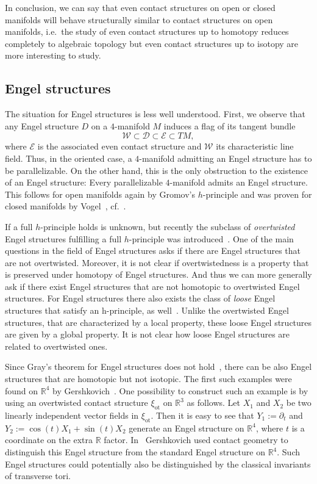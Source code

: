\documentclass{amsart} %
\newcommand{\R}{\mathbb{R}}
\newcommand{\xiot}{\xi_{\mathrm{ot}}}
\newcommand{\D}{\mathcal{D}}
\newcommand{\E}{\mathcal{E}}
\newcommand{\W}{\mathcal{W}}
\theoremstyle{thm}
\theoremstyle{definition}
\begin{document}
In conclusion, we can say that even contact structures on open or closed manifolds will behave structurally similar to contact structures on open manifolds, i.e.\ the study of even contact structures up to homotopy reduces completely to algebraic topology but even contact structures up to isotopy are more interesting to study. 


\subsection{Engel structures}
The situation for Engel structures is less well understood. First, we observe that any Engel structure $D$ on a $4$-manifold $M$ induces a flag of its tangent bundle
$$\W\subset\D\subset\E\subset TM,$$
where $\E$ is the associated even contact structure and $\W$ its characteristic line field. Thus, in the oriented case, a $4$-manifold admitting an Engel structure has to be parallelizable. On the other hand, this is the only obstruction to the existence of an Engel structure: Every parallelizable $4$-manifold admits an Engel structure. This follows for open manifolds again by Gromov's $h$-principle and was proven for closed manifolds by Vogel~\cite{Vo09}, cf.~\cite{CPPP17}.

If a full $h$-principle holds is unknown, but recently the subclass of \textit{overtwisted} Engel structures fulfilling a full $h$-principle was introduced~\cite{PV20}. One of the main questions in the field of Engel structures asks if there are Engel structures that are not overtwisted. Moreover, it is not clear if overtwistedness is a property that is preserved under homotopy of Engel structures. And thus we can more generally ask if there exist Engel structures that are not homotopic to overtwisted Engel structures. For Engel structures there also exists the class of \textit{loose} Engel structures that satisfy an h-principle, as well~\cite{CPP20}. Unlike the overtwisted Engel structures, that are characterized by a local property, these loose Engel structures are given by a global property. It is not clear how loose Engel structures are related to overtwisted ones.

Since Gray's theorem for Engel structures does not hold~\cite{Mo99}, there can be also Engel structures that are homotopic but not isotopic. The first such examples were found on $\R^4$ by Gershkovich~\cite{Ge95}. One possibility to construct such an example is by using an overtwisted contact structure $\xiot$ on $\R^3$ as follows. Let $X_1$ and $X_2$ be two linearly independent vector fields in $\xiot$. Then it is easy to see that $Y_1:=\partial_t$ and $Y_2:=\cos(t)X_1+\sin(t)X_2$ generate an Engel structure on $\R^4$, where $t$ is a coordinate on the extra $\R$ factor. In~\cite{Ge95} Gershkovich used contact geometry to distinguish this Engel structure from the standard Engel structure on $\R^4$. Such Engel structures could potentially also be distinguished by the classical invariants of transverse tori.
\end{document}
